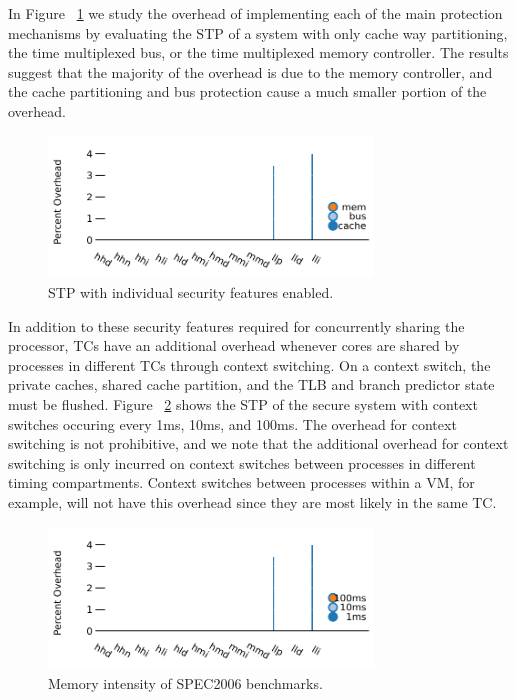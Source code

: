 In Figure ~\ref{fig:breakdown} we study the overhead of implementing each of 
the main protection mechanisms by evaluating the STP of a system with only 
cache way partitioning, the time multiplexed bus, or the time multiplexed 
memory controller. The results suggest that the majority of the overhead is due 
to the memory controller, and the cache partitioning and bus protection cause a 
much smaller portion of the overhead.

\begin{figure}
    \begin{center}
        \includegraphics[width=3.4in]{figs/breakdown_stp.pdf}
        \caption{STP with individual security features enabled.} 
        \label{fig:breakdown}
    \end{center}
\end{figure}

In addition to these security features required for concurrently sharing the 
processor, TCs have an additional overhead whenever cores are shared by 
processes in different TCs through context switching. On a context switch, the 
private caches, shared cache partition, and the TLB and branch predictor state 
must be flushed. Figure ~\ref{fig:flushing} shows the STP of the secure system 
with context switches occuring every 1ms, 10ms, and 100ms. The overhead for 
context switching is not prohibitive, and we note that the additional overhead 
for context switching is only incurred on context switches between processes in 
different timing compartments. Context switches between processes within a VM, 
for example, will not have this overhead since they are most likely in the same 
TC.

\begin{figure}
    \begin{center}
        \includegraphics[width=3.4in]{figs/flushing_stp.pdf}
        \caption{Memory intensity of SPEC2006 benchmarks.}
        \label{fig:flushing}
    \end{center}
\end{figure}

